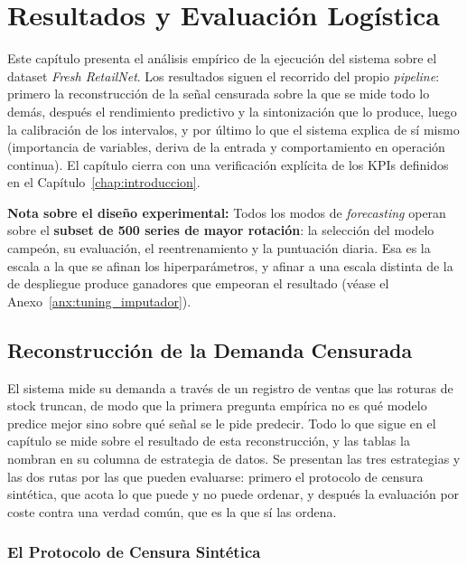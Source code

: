 \chapter{Resultados y Evaluación Logística}
\label{chap:resultados}

Este capítulo presenta el análisis empírico de la ejecución del sistema sobre el dataset \textit{Fresh RetailNet}. Los resultados siguen el recorrido del propio \textit{pipeline}: primero la reconstrucción de la señal censurada sobre la que se mide todo lo demás, después el rendimiento predictivo y la sintonización que lo produce, luego la calibración de los intervalos, y por último lo que el sistema explica de sí mismo (importancia de variables, deriva de la entrada y comportamiento en operación continua). El capítulo cierra con una verificación explícita de los KPIs definidos en el Capítulo~\ref{chap:introduccion}.

\textbf{Nota sobre el diseño experimental:} Todos los modos de \textit{forecasting} operan sobre el \textbf{subset de 500 series de mayor rotación}: la selección del modelo campeón, su evaluación, el reentrenamiento y la puntuación diaria. Esa es la escala a la que se afinan los hiperparámetros, y afinar a una escala distinta de la de despliegue produce ganadores que empeoran el resultado (véase el Anexo~\ref{anx:tuning_imputador}).

\section{Reconstrucción de la Demanda Censurada}
\label{sec:resultados_censura}

El sistema mide su demanda a través de un registro de ventas que las roturas de stock truncan, de modo que la primera pregunta empírica no es qué modelo predice mejor sino sobre qué señal se le pide predecir. Todo lo que sigue en el capítulo se mide sobre el resultado de esta reconstrucción, y las tablas la nombran en su columna de estrategia de datos. Se presentan las tres estrategias y las dos rutas por las que pueden evaluarse: primero el protocolo de censura sintética, que acota lo que puede y no puede ordenar, y después la evaluación por coste contra una verdad común, que es la que sí las ordena.

\subsection{El Protocolo de Censura Sintética}
\label{sec:imputacion_censura_sintetica}

